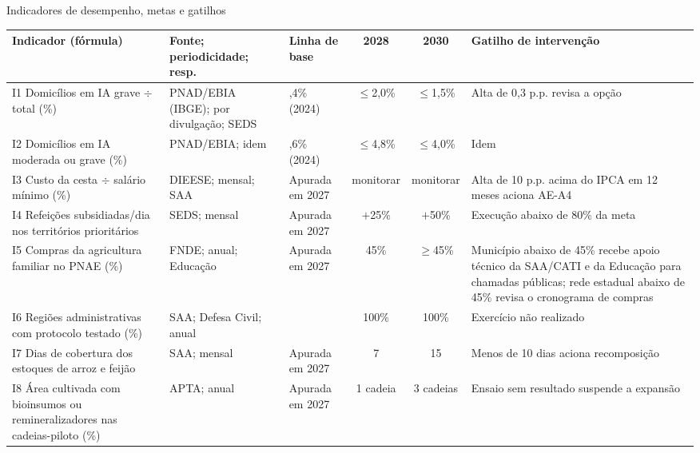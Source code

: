 \documentclass[
	12pt,				%
	openright,			%
	oneside,			%
	a4paper,			%
	chapter=TITLE,		%
	section=TITLE,		%
	english,			%
	french,				%
	spanish,			%
	brazil,				%
 ]{abntex2}
\begin{document}
\begin{quadro}[!htbp]
\centering
\caption{Indicadores de desempenho, metas e gatilhos}
\label{qua:indicadores}
\footnotesize
\renewcommand{\arraystretch}{1.05}
\setlength{\tabcolsep}{2.5pt}
\begin{tabularx}{\textwidth}{|>{\raggedright\arraybackslash}p{2.9cm}|>{\raggedright\arraybackslash}p{2.3cm}|>{\raggedright\arraybackslash}p{1.6cm}|c|c|>{\raggedright\arraybackslash}X|}
\hline
\textbf{Indicador (fórmula)} & \textbf{Fonte; periodicidade; resp.} & \textbf{Linha de base} & \textbf{2028} & \textbf{2030} & \textbf{Gatilho de intervenção} \\
\hline
I1 Domicílios em IA grave $\div$ total (\%) & PNAD/EBIA (IBGE); por divulgação; SEDS & 2,4\% (2024) & $\leq$2,0\% & $\leq$1,5\% & Alta de 0,3 p.p. revisa a opção \\
\hline
I2 Domicílios em IA moderada ou grave (\%) & PNAD/EBIA; idem & 5,6\% (2024) & $\leq$4,8\% & $\leq$4,0\% & Idem \\
\hline
I3 Custo da cesta $\div$ salário mínimo (\%) & DIEESE; mensal; SAA & Apurada em 2027 & monitorar & monitorar & Alta de 10 p.p. acima do IPCA em 12 meses aciona AE-A4 \\
\hline
I4 Refeições subsidiadas/dia nos territórios prioritários & SEDS; mensal & Apurada em 2027 & $+$25\% & $+$50\% & Execução abaixo de 80\% da meta \\
\hline
I5 Compras da agricultura familiar no PNAE (\%) & FNDE; anual; Educação & Apurada em 2027 & 45\% & $\geq$45\% & Município abaixo de 45\% recebe apoio técnico da SAA/CATI e da Educação para chamadas públicas; rede estadual abaixo de 45\% revisa o cronograma de compras \\
\hline
I6 Regiões administrativas com protocolo testado (\%) & SAA; Defesa Civil; anual & 0 & 100\% & 100\% & Exercício não realizado \\
\hline
I7 Dias de cobertura dos estoques de arroz e feijão & SAA; mensal & Apurada em 2027 & 7 & 15 & Menos de 10 dias aciona recomposição \\
\hline
I8 Área cultivada com bioinsumos ou remineralizadores nas cadeias-piloto (\%) & APTA; anual & Apurada em 2027 & 1 cadeia & 3 cadeias & Ensaio sem resultado suspende a expansão \\
\hline
\end{tabularx}
\end{quadro}
\end{document}
